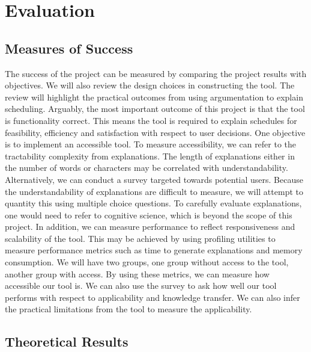 \chapter{Evaluation}

\section{Measures of Success}

The success of the project can be measured by comparing the project results with objectives. We will also review the design choices in constructing the tool. The review will highlight the practical outcomes from using argumentation to explain scheduling.
\linespace
Arguably, the most important outcome of this project is that the tool is functionality correct. This means the tool is required to explain schedules for feasibility, efficiency and satisfaction with respect to user decisions.
\linespace
One objective is to implement an accessible tool. To measure accessibility, we can refer to the tractability complexity from explanations. The length of explanations either in the number of words or characters may be correlated with understandability. Alternatively, we can conduct a survey targeted towards potential users. Because the understandability of explanations are difficult to measure, we will attempt to quantity this using multiple choice questions. To carefully evaluate explanations, one would need to refer to cognitive science, which is beyond the scope of this project. In addition, we can measure performance to reflect responsiveness and scalability of the tool. This may be achieved by using profiling utilities to measure performance metrics such as time to generate explanations and memory consumption. We will have two groups, one group without access to the tool, another group with access. By using these metrics, we can measure how accessible our tool is.
\linespace
We can also use the survey to ask how well our tool performs with respect to applicability and knowledge transfer. We can also infer the practical limitations from the tool to measure the applicability.

\section{Theoretical Results}

